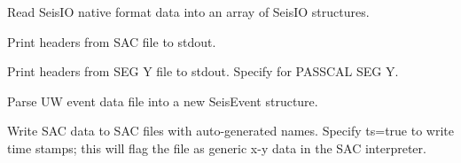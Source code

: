 \documentclass[letterpaper,11pt,english]{sphinxmanual}
\begin{document}
Read SeisIO native format data into an array of SeisIO structures.

\begin{fulllineitems}
\label{\detokenize{src/Formats/timeseries:sachdr}}
\end{fulllineitems}


Print headers from SAC file to stdout.

\begin{fulllineitems}
\label{\detokenize{src/Formats/timeseries:segyhdr}}
\end{fulllineitems}


Print headers from SEG Y file to stdout. Specify  for PASSCAL SEG Y.

\begin{fulllineitems}
\label{\detokenize{src/Formats/timeseries:uwdf}}
\end{fulllineitems}


Parse UW event data file  into a new SeisEvent structure.

\begin{fulllineitems}
\label{\detokenize{src/Formats/timeseries:writesac}}
\end{fulllineitems}


Write SAC data to SAC files with auto-generated names. Specify ts=true to write
time stamps; this will flag the file as generic x-y data in the SAC interpreter.

\begin{fulllineitems}
\label{\detokenize{src/Formats/timeseries:wseis}}
\end{fulllineitems}
\end{document}
